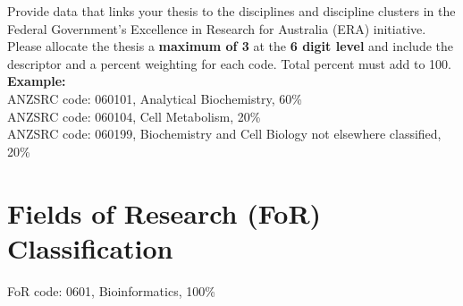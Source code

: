 \begin{instructional}
    Provide data that links your thesis to the disciplines and discipline clusters in the Federal Government’s Excellence in Research for Australia (ERA) initiative.\\
    
    \noindent
    Please allocate the thesis a \textbf{maximum of 3} \href{http://www.abs.gov.au/Ausstats/abs@.nsf/Latestproducts/6BB427AB9696C225CA2574180004463E?opendocument}{\color{blue}{Australian and New Zealand Standard Research Classifications (ANZSRC) codes}} at the \textbf{6 digit level} and include the descriptor and a percent weighting for each code. Total percent must add to 100.\\


\textbf{Example:}\\


    ANZSRC code: 060101, Analytical Biochemistry, 60\% \\
    \indent ANZSRC code: 060104, Cell Metabolism, 20\% \\
    \indent ANZSRC code: 060199, Biochemistry and Cell Biology not elsewhere classified, 20\%
\end{instructional}





\section*{Fields of Research (FoR) Classification}

    



\indent FoR code: 0601, Bioinformatics, 100\% \\

